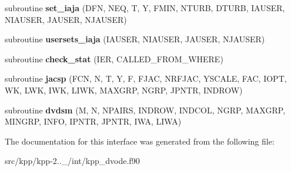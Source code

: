 \begin{DoxyCompactItemize}
\mbox{\label{interfacekpp__root__integrator_1_1dvode__f90_ab0e5bdf419633959be0923f4f09bc7e5}} 
subroutine {\bfseries set\+\_\+iaja} (D\+FN, N\+EQ, T, Y, F\+M\+IN, N\+T\+U\+RB, D\+T\+U\+RB, I\+A\+U\+S\+ER, N\+I\+A\+U\+S\+ER, J\+A\+U\+S\+ER, N\+J\+A\+U\+S\+ER)
\item 
\mbox{\label{interfacekpp__root__integrator_1_1dvode__f90_a9a222f417435c4fd0883f1832e5b48f5}} 
subroutine {\bfseries usersets\+\_\+iaja} (I\+A\+U\+S\+ER, N\+I\+A\+U\+S\+ER, J\+A\+U\+S\+ER, N\+J\+A\+U\+S\+ER)
\item 
\mbox{\label{interfacekpp__root__integrator_1_1dvode__f90_ace2df733686378f3dbf4f04f001ea65f}} 
subroutine {\bfseries check\+\_\+stat} (I\+ER, C\+A\+L\+L\+E\+D\+\_\+\+F\+R\+O\+M\+\_\+\+W\+H\+E\+RE)
\item 
\mbox{\label{interfacekpp__root__integrator_1_1dvode__f90_a8363ad50e471b3fff2ab187165a6018d}} 
subroutine {\bfseries jacsp} (F\+CN, N, T, Y, F, F\+J\+AC, N\+R\+F\+J\+AC, Y\+S\+C\+A\+LE, F\+AC, I\+O\+PT, WK, L\+WK, I\+WK, L\+I\+WK, M\+A\+X\+G\+RP, N\+G\+RP, J\+P\+N\+TR, I\+N\+D\+R\+OW)
\item 
\mbox{\label{interfacekpp__root__integrator_1_1dvode__f90_a58f0efef1af8d488c8120287db3e358e}} 
subroutine {\bfseries dvdsm} (M, N, N\+P\+A\+I\+RS, I\+N\+D\+R\+OW, I\+N\+D\+C\+OL, N\+G\+RP, M\+A\+X\+G\+RP, M\+I\+N\+G\+RP, I\+N\+FO, I\+P\+N\+TR, J\+P\+N\+TR, I\+WA, L\+I\+WA)
\end{DoxyCompactItemize}


The documentation for this interface was generated from the following file\+:\begin{DoxyCompactItemize}
\item 
src/kpp/kpp-\/2..\+\_/int/kpp\+\_\+dvode.\+f90\end{DoxyCompactItemize}
